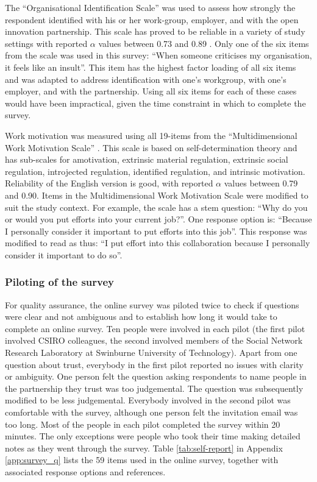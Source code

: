 The \enquote{Organisational Identification Scale} \citep{mael1992alumni} was used to assess how strongly the respondent identified with his or her work\hyp{}group, employer, and with the open innovation partnership. This scale has proved to be reliable in a variety of study settings with reported $\alpha$ values between 0.73 and 0.89 \citep{mael1992alumni,bergami2000self,knippenberg2000foci,van2008interactive}. Only one of the six items from the scale was used in this survey: \enquote{When someone criticises my organisation, it feels like an insult}. This item has the highest factor loading of all six items \citep{mael1992identifying} and was adapted to address identification with one's workgroup, with one's employer, and with the partnership. Using all six items for each of these cases would have been impractical, given the time constraint in which to complete the survey. \medskip

Work motivation was measured using all 19-items from the \enquote{Multidimensional Work Motivation Scale} \citep{gagne2015multidimensional}. This scale is based on self-determination theory and has sub-scales for amotivation, extrinsic material regulation, extrinsic social regulation, introjected regulation, identified regulation, and intrinsic motivation. Reliability of the English version is good, with reported $\alpha$ values between 0.79 and 0.90. Items in the Multidimensional Work Motivation Scale were modified to suit the study context. For example, the scale has a stem question: \enquote{Why do you or would you put efforts into your current job?}. One response option is: \enquote{Because I personally consider it important to put efforts into this job}. This response was modified to read as thus: \enquote{I put effort into this collaboration because I personally consider it important to do so}. 

\subsubsection{Piloting of the survey}

For quality assurance, the online survey was piloted twice to check if questions were clear and not ambiguous and to establish how long it would take to complete an online survey. Ten people were involved in each pilot (the first pilot involved CSIRO colleagues, the second involved members of the Social Network Research Laboratory at Swinburne University of Technology). Apart from one question about trust, everybody in the first pilot reported no issues with clarity or ambiguity. One person felt the question asking respondents to name people in the partnership they trust was too judgemental. The question was subsequently modified to be less judgemental. Everybody involved in the second pilot was comfortable with the survey, although one person felt the invitation email was too long. Most of the people in each pilot completed the survey within 20 minutes. The only exceptions were people who took their time making detailed notes as they went through the survey. Table \ref{tab:self-report} in Appendix \ref{app:survey_q} lists the 59 items used in the online survey, together with associated response options and references.

